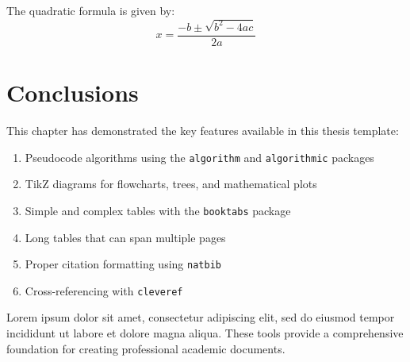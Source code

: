 The quadratic formula is given by:
\begin{equation}
x = \frac{-b \pm \sqrt{b^2 - 4ac}}{2a}
\label{eq:example}
\end{equation}

\section{Conclusions}
\label{sec:conclusions}

This chapter has demonstrated the key features available in this thesis template:

\begin{enumerate}
\item Pseudocode algorithms using the \texttt{algorithm} and \texttt{algorithmic} packages
\item TikZ diagrams for flowcharts, trees, and mathematical plots
\item Simple and complex tables with the \texttt{booktabs} package
\item Long tables that can span multiple pages
\item Proper citation formatting using \texttt{natbib}
\item Cross-referencing with \texttt{cleveref}
\end{enumerate}

Lorem ipsum dolor sit amet, consectetur adipiscing elit, sed do eiusmod tempor incididunt ut labore et dolore magna aliqua. These tools provide a comprehensive foundation for creating professional academic documents.